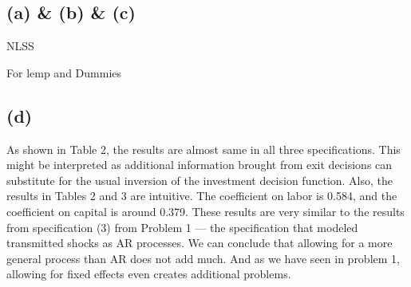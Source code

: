

\subsection{(a) \& (b) \& (c)}



\begin{table}[h!]
\parbox{.45\linewidth}{
    \centering
    \footnotesize{
    
    }
    \caption{NLSS}
    \label{tab:my_label}
    }
    \quad
\parbox{.45\linewidth}{
    \centering
    \footnotesize{
    
    }
    \caption{For lemp and Dummies}
    \label{tab:my_label}
}

\end{table}

\subsection{(d)}

As shown in Table 2, the results are almost same in all three specifications. This might be interpreted as additional information brought from exit decisions can substitute for the usual inversion of the investment decision function. Also, the results in Tables 2 and 3 are intuitive. The coefficient on labor is 0.584, and the coefficient on capital is around 0.379. These results are very similar to the results from specification (3) from Problem 1 — the specification that modeled transmitted shocks as AR processes. We can conclude that allowing for a more general process than AR does not add much. And as we have seen in problem 1, allowing for fixed effects even creates additional problems.


